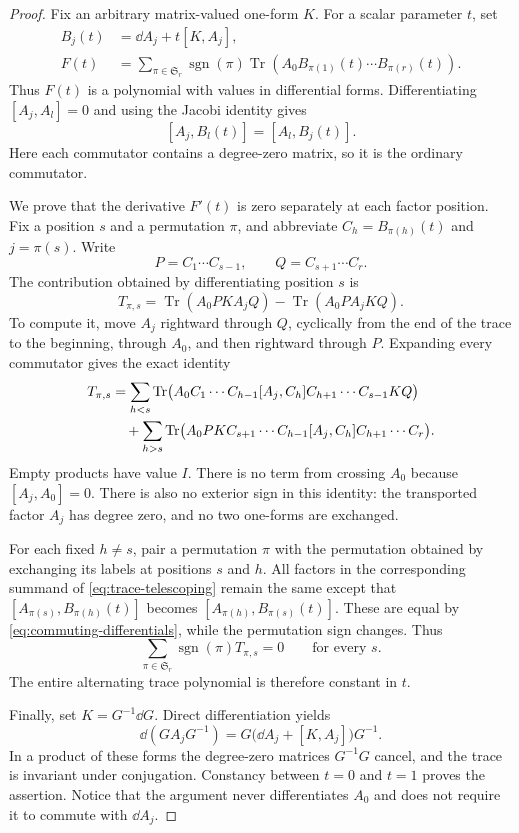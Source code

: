 \begin{proof}
Fix an arbitrary matrix-valued one-form $K$. For a scalar parameter $t$,
set
\[
 \begin{aligned}
 B_j(t)&=\dd A_j+t[K,A_j],\\
 F(t)&=\sum_{\pi\in\mathfrak S_r}\operatorname{sgn}(\pi)
       \operatorname{Tr}(A_0B_{\pi(1)}(t)\cdots B_{\pi(r)}(t)).
 \end{aligned}
\]
Thus $F(t)$ is a polynomial with values in differential forms.
Differentiating $[A_j,A_l]=0$ and using the Jacobi identity gives
\begin{equation}
\label{eq:commuting-differentials}
 [A_j,B_l(t)]=[A_l,B_j(t)].
\end{equation}
Here each commutator contains a degree-zero matrix, so it is the ordinary
commutator.

We prove that the derivative $F'(t)$ is
zero separately at each factor position.  Fix a position $s$ and a
permutation $\pi$, and abbreviate $C_h=B_{\pi(h)}(t)$ and $j=\pi(s)$.
Write
\[
 P=C_1\cdots C_{s-1},\qquad Q=C_{s+1}\cdots C_r.
\]
The contribution obtained by differentiating position $s$ is
\[
 T_{\pi,s}=\operatorname{Tr}(A_0PKA_jQ)
              -\operatorname{Tr}(A_0PA_jKQ).
\]
To compute it, move $A_j$ rightward through $Q$, cyclically from the
end of the trace to the beginning, through $A_0$, and then rightward
through $P$.  Expanding every commutator gives the exact identity
\begin{align}
 T_{\pi,s}
 &=\sum_{h<s}\operatorname{Tr}\bigl(
    A_0C_1\cdots C_{h-1}[A_j,C_h]
    C_{h+1}\cdots C_{s-1}KQ\bigr) \notag\\
 &\quad+\sum_{h>s}\operatorname{Tr}\bigl(
    A_0PKC_{s+1}\cdots C_{h-1}[A_j,C_h]
    C_{h+1}\cdots C_r\bigr).
 \label{eq:trace-telescoping}
\end{align}
Empty products have value $I$.  There is no term from crossing $A_0$
because $[A_j,A_0]=0$.  There is also no exterior sign in this identity:
the transported factor $A_j$ has degree zero, and no two one-forms
are exchanged.

For each fixed $h\ne s$, pair a permutation $\pi$ with the permutation
obtained by exchanging its labels at positions $s$ and $h$.
All factors in the corresponding summand of
\eqref{eq:trace-telescoping} remain the same except that
$[A_{\pi(s)},B_{\pi(h)}(t)]$ becomes
$[A_{\pi(h)},B_{\pi(s)}(t)]$.
These are equal by \eqref{eq:commuting-differentials}, while the
permutation sign changes.  Thus
\[
 \sum_{\pi\in\mathfrak S_r}\operatorname{sgn}(\pi)T_{\pi,s}=0
 \qquad\text{for every }s.
\]
The entire alternating trace polynomial is therefore constant in $t$.

Finally, set $K=G^{-1}\dd G$.  Direct differentiation yields
\[
 \dd(GA_jG^{-1})=G\bigl(\dd A_j+[K,A_j]\bigr)G^{-1}.
\]
In a product of these forms the degree-zero matrices $G^{-1}G$ cancel,
and the trace is invariant under conjugation.  Constancy between $t=0$
and $t=1$ proves the assertion.  Notice that the argument never
differentiates $A_0$ and does not require it to commute with $\dd A_j$.
\end{proof}

